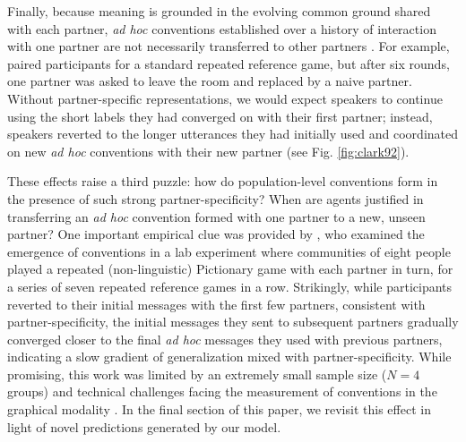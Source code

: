 Finally, because meaning is grounded in the evolving common ground shared with each partner, \emph{ad hoc} conventions established over a history of interaction with one partner are not necessarily transferred to other partners \cite{metzing_when_2003,weber_cultural_2003,horton_revisiting_2016}. 
For example,  paired participants for a standard repeated reference game, but after six rounds, one partner was asked to leave the room and replaced by a naive partner. 
Without partner-specific representations, we would expect speakers to continue using the short labels they had converged on with their first partner; instead, speakers reverted to the longer utterances they had initially used and coordinated on new \emph{ad hoc} conventions with their new partner (see Fig. \ref{fig:clark92}).

These effects raise a third puzzle: how do population-level conventions form in the presence of such strong partner-specificity?
When are agents justified in transferring an \emph{ad hoc} convention formed with one partner to a new, unseen partner? 
One important empirical clue was provided by , who examined the emergence of conventions in a lab experiment where communities of eight people played a repeated (non-linguistic) Pictionary game with each partner in turn, for a series of seven repeated reference games in a row. 
Strikingly, while participants reverted to their initial messages with the first few partners, consistent with partner-specificity, the initial messages they sent to subsequent partners gradually converged closer to the final \emph{ad hoc} messages they used with previous partners, indicating a slow gradient of generalization mixed with partner-specificity.
While promising, this work was limited by an extremely small sample size ($N = 4$ groups) and technical challenges facing the measurement of conventions in the graphical modality \cite<but see>{hawkins2019disentangling}.
In the final section of this paper, we revisit this effect in light of novel predictions generated by our model. 













